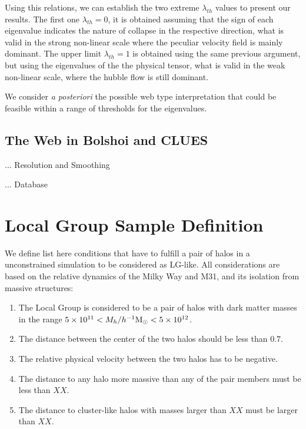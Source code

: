 \documentclass[usenatbib]{latex/mn2e}
\begin{document}
Using this relations, we can establish the two extreme $\lambda_{th}$ 
values to present our results. The first one $\lambda_{th} = 0$, it is 
obtained assuming that the sign of each eigenvalue indicates the nature of
collapse in the respective direction, what is valid in the strong 
non-linear scale where the peculiar velocity field is mainly dominant. 
The upper limit $\lambda_{th} = 1$ is obtained using the same previous 
argument, but using the eigenvalues of the the physical tensor, what is 
valid in the weak non-linear scale, where the hubble flow is still 
dominant.


We consider \textit{a posteriori} the possible web type interpretation 
that could be feasible within a range of thresholds for the eigenvalues. 


\subsection{The Web in Bolshoi and CLUES}
\label{subsec:web_in_simulations}
... Resolution and Smoothing

... Database


\section{Local Group Sample Definition}
\label{section:Def_Samples}

We define list here conditions that have to fulfill a pair of halos in a 
unconstrained simulation to be considered as LG-like. All considerations 
are based on the relative dynamics of the Milky Way and M31, and its 
isolation from massive structures:


\begin{enumerate}
\item{The Local Group is considered to be a pair of halos with dark matter 
masses in the range $5\times10^{11}<M_{h}/\hMsun < 5\times 10^{12}$.}

\item{The distance between the center of the two halos should be less than 
$0.7$\hMpc.}

\item{The relative physical velocity between the two halos has to be 
negative.}

\item{The distance to any halo more massive than any of the pair members 
must be less than $XX$\hMpc.}

\item{The distance to cluster-like halos with masses larger than $XX$\hMpc 
must be larger than $XX$\hMpc.}
\end{enumerate}
\end{document}
